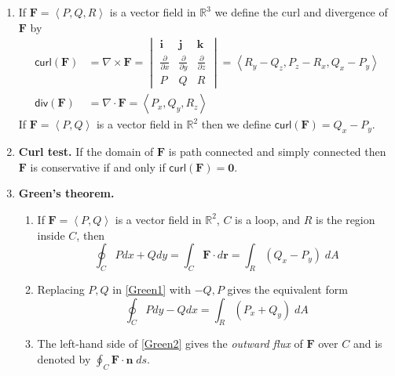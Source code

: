 \documentclass[12pt]{article}
\begin{document}
\begin{enumerate}
\item\label{Curl}
If $\mathbold{F}=\left\langle P,Q,R\right\rangle$
is a vector field in $\mathbb{R}^3$
we define the curl and divergence of $\mathbold{F}$ by
\begin{align*}
\mathsf{curl}\left(\mathbold{F}\right)
&=\nabla\times\mathbold{F}
=\begin{vmatrix}
\mathbold{i}&\mathbold{j}&\mathbold{k}\\
\frac{\partial}{\partial x}&\frac{\partial}{\partial y}
&\frac{\partial}{\partial z}\\P&Q&R 
\end{vmatrix}
=\left\langle R_y-Q_z,P_z-R_x,Q_x-P_y\right\rangle\\
\mathsf{div}\left(\mathbold{F}\right)
&=\nabla\cdot\mathbold{F}=\left\langle P_x,Q_y,R_z\right\rangle
\end{align*}
If $\mathbold{F}=\left\langle P,Q\right\rangle$ 
is a vector field in $\mathbb{R}^2$
then we define
$\mathsf{curl}\left(\mathbold{F}\right)
=Q_x-P_y$.

\item{\bf Curl test.} If the domain of $\mathbold{F}$
is path connected and simply connected then
$\mathbold{F}$ is conservative if and only if $\mathsf{curl}
\left(\mathbold{F}\right)=\mathbold{0}$.

\item{\bf Green's theorem.}
\begin{enumerate}
\item If $\mathbold{F}=\left\langle P,Q\right\rangle$ is a vector
field in $\mathbb{R}^2$, $C$ is a loop,
and $R$ is the region inside $C$, then
\begin{equation}\label{Green1}
\oint_C Pdx+Qdy
=\int_C\mathbold{F}\cdot d\mathbold{r}
=\int_R\left(Q_x-P_y\right)\;dA
\end{equation}
\item Replacing $P,Q$ in \autoref{Green1} with $-Q,P$ gives
the equivalent form
\begin{equation}\label{Green2}
\oint_C Pdy-Qdx
=\int_R\left(P_x+Q_y\right)\;dA
\end{equation}
\item The left-hand side of \autoref{Green2} gives
the {\em outward flux} of $\mathbold{F}$ over $C$
and is denoted by $\oint_C\mathbold{F}\cdot\mathbold{n}\;ds$.
\end{enumerate}


\end{enumerate}
\end{document}
